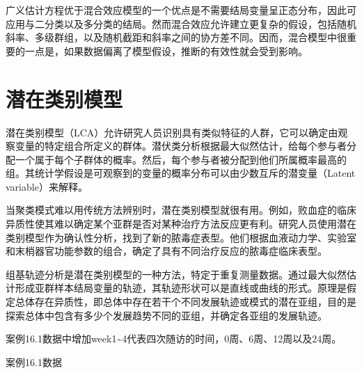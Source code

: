\documentclass[
  chinese-hans,
  letterpaper,
  DIV=11,
  numbers=noendperiod]{scrreprt}
\begin{document}
广义估计方程优于混合效应模型的一个优点是不需要结局变量呈正态分布，因此可应用与二分类以及多分类的结局。然而混合效应允许建立更复杂的假设，包括随机斜率、多级群组，以及随机截距和斜率之间的协方差不同。因而，混合模型中很重要的一点是，如果数据偏离了模型假设，推断的有效性就会受到影响。

\section{潜在类别模型}\label{ux6f5cux5728ux7c7bux522bux6a21ux578b}

潜在类别模型（LCA）允许研究人员识别具有类似特征的人群，它可以确定由观察变量的特定组合所定义的群体。潜伏类分析根据最大似然估计，给每个参与者分配一个属于每个子群体的概率。然后，每个参与者被分配到他们所属概率最高的组。其统计学假设是可观察到的变量的概率分布可以由少数互斥的潜变量（Latent
variable）来解释。

当聚类模式难以用传统方法辨别时，潜在类别模型就很有用。例如，败血症的临床异质性使其难以确定某个亚群是否对某种治疗方法反应更有利。研究人员使用潜在类别模型作为确认性分析，找到了新的脓毒症表型。他们根据血液动力学、实验室和末梢器官功能参数的组合，确定了具有不同治疗反应的脓毒症临床表型。

组基轨迹分析是潜在类别模型的一种方法，特定于重复测量数据。通过最大似然估计形成亚群样本结局变量的轨迹，其轨迹形状可以是直线或曲线的形式。原理是假定总体存在异质性，即总体中存在若干个不同发展轨迹或模式的潜在亚组，目的是探索总体中包含有多少个发展趋势不同的亚组，并确定各亚组的发展轨迹。

案例16.1数据中增加week1\textasciitilde4代表四次随访的时间，0周、6周、12周以及24周。

案例16.1数据
\end{document}
